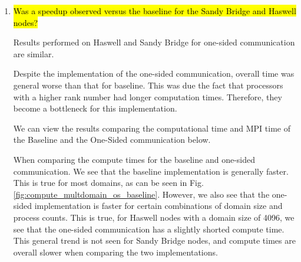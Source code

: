 \begin{enumerate}
  \item \hl{Was a speedup observed versus the baseline for the Sandy Bridge and Haswell nodes?}

    Results performed on Haswell and Sandy Bridge for one-sided communication are similar.
  
    Despite the implementation of the one-sided communication, overall time was general worse than
    that for baseline. 
    This was due the fact that processors with a higher rank number had longer computation times. 
    Therefore, they become a bottleneck for this implementation. 
    
    We can view the results comparing the computational time and MPI time of the Baseline and the One-Sided communication below. 
    
    When comparing the compute times for the baseline and one-sided communication. We see that the baseline implementation is generally faster.
    This is true for most domains, as can be seen in Fig. \ref{fig:compute_multdomain_os_baseline}.
    However, we also see that the one-sided implementation is faster for certain combinations of domain size and process counts.
    This is true, for Haswell nodes with a domain size of 4096, we see that the one-sided communication has a slightly shorted compute time.
    This general trend is not seen for Sandy Bridge nodes, and compute times are overall slower when comparing the two implementations. 
    

\end{enumerate}
